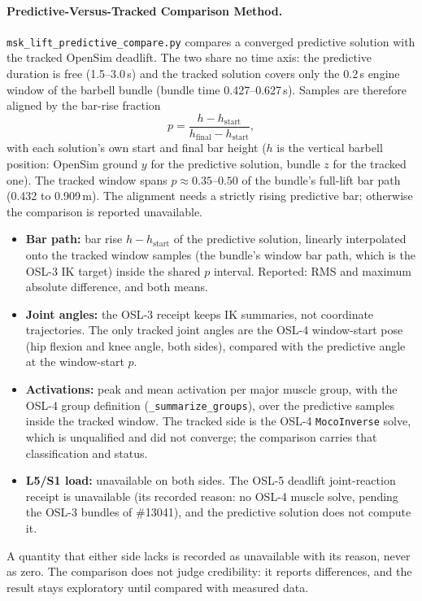 \documentclass[11pt,a4paper]{article}
\begin{document}
\paragraph{Predictive-Versus-Tracked Comparison Method.}
\texttt{msk\_lift\_predictive\_compare.py} compares a converged predictive solution with the tracked OpenSim deadlift. The two share no time axis: the predictive duration is free (1.5--3.0\,s) and the tracked solution covers only the 0.2\,s engine window of the barbell bundle (bundle time 0.427--0.627\,s). Samples are therefore aligned by the bar-rise fraction
\begin{equation}
  p = \frac{h - h_\mathrm{start}}{h_\mathrm{final} - h_\mathrm{start}},
\end{equation}
with each solution's own start and final bar height ($h$ is the vertical barbell position: OpenSim ground $y$ for the predictive solution, bundle $z$ for the tracked one). The tracked window spans $p \approx 0.35$--$0.50$ of the bundle's full-lift bar path (0.432 to 0.909\,m). The alignment needs a strictly rising predictive bar; otherwise the comparison is reported unavailable.
\begin{itemize}
\item \textbf{Bar path:} bar rise $h - h_\mathrm{start}$ of the predictive solution, linearly interpolated onto the tracked window samples (the bundle's window bar path, which is the OSL-3 IK target) inside the shared $p$ interval. Reported: RMS and maximum absolute difference, and both means.
\item \textbf{Joint angles:} the OSL-3 receipt keeps IK summaries, not coordinate trajectories. The only tracked joint angles are the OSL-4 window-start pose (hip flexion and knee angle, both sides), compared with the predictive angle at the window-start $p$.
\item \textbf{Activations:} peak and mean activation per major muscle group, with the OSL-4 group definition (\texttt{\_summarize\_groups}), over the predictive samples inside the tracked window. The tracked side is the OSL-4 \texttt{MocoInverse} solve, which is unqualified and did not converge; the comparison carries that classification and status.
\item \textbf{L5/S1 load:} unavailable on both sides. The OSL-5 deadlift joint-reaction receipt is unavailable (its recorded reason: no OSL-4 muscle solve, pending the OSL-3 bundles of \#13041), and the predictive solution does not compute it.
\end{itemize}
A quantity that either side lacks is recorded as unavailable with its reason, never as zero. The comparison does not judge credibility: it reports differences, and the result stays exploratory until compared with measured data.
\end{document}
